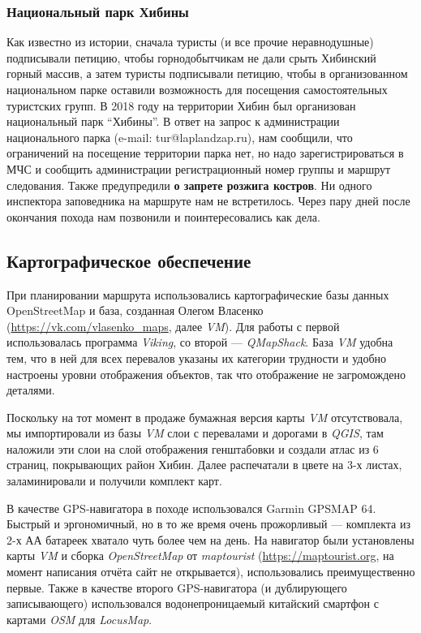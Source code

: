 \subsubsection{Национальный парк Хибины}
Как известно из истории, сначала туристы (и все прочие неравнодушные) подписывали петицию,
чтобы горнодобытчикам не дали срыть Хибинский горный массив, а затем туристы подписывали петицию,
чтобы в организованном национальном парке оставили возможность для посещения самостоятельных туристских групп.
В 2018 году на территории Хибин был организован национальный парк \enquote{Хибины}.
В ответ на запрос к администрации национального парка (e-mail: tur@laplandzap.ru), нам сообщили,
что ограничений на посещение территории парка нет, но надо зарегистрироваться в МЧС
и сообщить администрации регистрационный номер группы и маршрут следования.
Также предупредили \textbf{\color{red}о запрете розжига костров}. Ни одного инспектора заповедника на маршруте нам не встретилось.
Через пару дней после окончания похода нам позвонили и поинтересовались как дела.

\subsection{Картографическое обеспечение}
При планировании маршрута использовались картографические базы данных OpenStreetMap и база,
созданная Олегом Власенко (\url{https://vk.com/vlasenko_maps}, далее \textit{VM}).
Для работы с первой использовалась программа \textit{Viking},
со второй --- \textit{QMapShack}. База \textit{VM} удобна тем, что в ней для всех перевалов указаны их категории трудности
и удобно настроены уровни отображения объектов, так что отображение не загромождено деталями.

Поскольку на тот момент в продаже бумажная версия карты \textit{VM} отсутствовала,
мы импортировали из базы \textit{VM} слои с перевалами и дорогами в \textit{QGIS},
там наложили эти слои на слой отображения генштабовки и создали атлас из 6 страниц,
покрывающих район Хибин. Далее распечатали в цвете на 3-х листах, заламинировали и получили комплект карт.

В качестве GPS-навигатора в походе использовался Garmin GPSMAP 64.
Быстрый и эргономичный, но в то же время очень прожорливый --- комплекта из 2-х АА батареек хватало чуть более чем на день.
На навигатор были установлены карты \textit{VM} и сборка \textit{OpenStreetMap}
от \textit{maptourist} (\url{https://maptourist.org}, на момент написания отчёта сайт не открывается),
использовались преимущественно первые. Также в качестве второго GPS-навигатора (и дублирующего записывающего)
использовался водонепроницаемый китайский смартфон с картами \textit{OSM} для \textit{LocusMap}.

